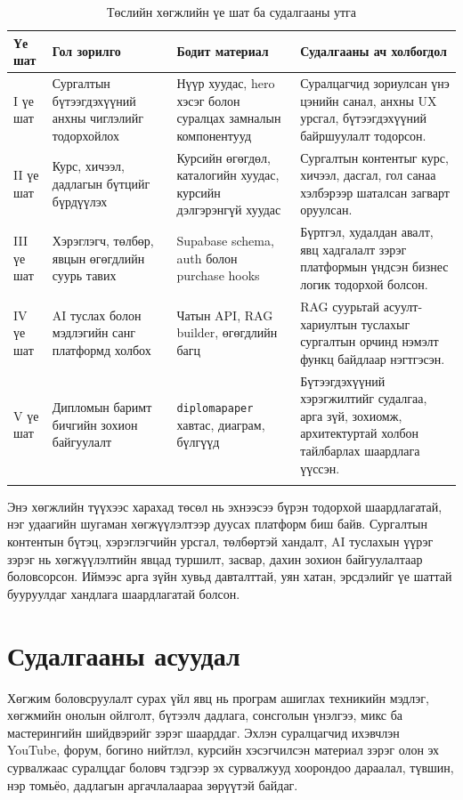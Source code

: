 \begin{longtable}{|p{}|p{}|p{}|p{}|}
  \hline
  \textbf{Үе шат} & \textbf{Гол зорилго} & \textbf{Бодит материал} & \textbf{Судалгааны ач холбогдол} \\ \hline
  I үе шат & Сургалтын бүтээгдэхүүний анхны чиглэлийг тодорхойлох & Нүүр хуудас, hero хэсэг болон суралцах замналын компонентууд & Суралцагчид зориулсан үнэ цэнийн санал, анхны UX урсгал, бүтээгдэхүүний байршуулалт тодорсон. \\ \hline
  II үе шат & Курс, хичээл, дадлагын бүтцийг бүрдүүлэх & Курсийн өгөгдөл, каталогийн хуудас, курсийн дэлгэрэнгүй хуудас & Сургалтын контентыг курс, хичээл, дасгал, гол санаа хэлбэрээр шаталсан загварт оруулсан. \\ \hline
  III үе шат & Хэрэглэгч, төлбөр, явцын өгөгдлийн суурь тавих & Supabase schema, auth болон purchase hooks & Бүртгэл, худалдан авалт, явц хадгалалт зэрэг платформын үндсэн бизнес логик тодорхой болсон. \\ \hline
  IV үе шат & AI туслах болон мэдлэгийн санг платформд холбох & Чатын API, RAG builder, өгөгдлийн багц & RAG суурьтай асуулт-хариултын туслахыг сургалтын орчинд нэмэлт функц байдлаар нэгтгэсэн. \\ \hline
  V үе шат & Дипломын баримт бичгийн зохион байгуулалт & \texttt{diplomapaper} хавтас, диаграм, бүлгүүд & Бүтээгдэхүүний хэрэгжилтийг судалгаа, арга зүй, зохиомж, архитектуртай холбон тайлбарлах шаардлага үүссэн. \\ \hline
  \caption{Төслийн хөгжлийн үе шат ба судалгааны утга}
  \label{tab:project-history}
\end{longtable}

Энэ хөгжлийн түүхээс харахад төсөл нь эхнээсээ бүрэн тодорхой шаардлагатай, нэг удаагийн шугаман хөгжүүлэлтээр дуусах платформ биш байв. Сургалтын контентын бүтэц, хэрэглэгчийн урсгал, төлбөртэй хандалт, AI туслахын үүрэг зэрэг нь хөгжүүлэлтийн явцад туршилт, засвар, дахин зохион байгуулалтаар боловсорсон. Иймээс арга зүйн хувьд давталттай, уян хатан, эрсдэлийг үе шаттай бууруулдаг хандлага шаардлагатай болсон.

\section{Судалгааны асуудал}
Хөгжим боловсруулалт сурах үйл явц нь програм ашиглах техникийн мэдлэг, хөгжмийн онолын ойлголт, бүтээлч дадлага, сонсголын үнэлгээ, микс ба мастерингийн шийдвэрийг зэрэг шаарддаг. Эхлэн суралцагчид ихэвчлэн YouTube, форум, богино нийтлэл, курсийн хэсэгчилсэн материал зэрэг олон эх сурвалжаас суралцдаг боловч тэдгээр эх сурвалжууд хоорондоо дараалал, түвшин, нэр томьёо, дадлагын аргачлалаараа зөрүүтэй байдаг.

